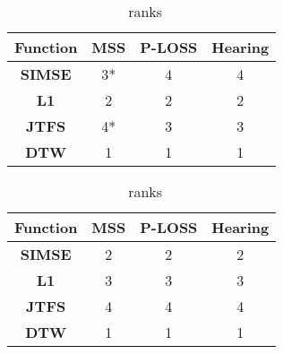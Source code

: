 \begin{table}[htbp]
\begin{minipage}{0.45\textwidth}
    \centering
    \begin{tabular}{|c|c|c|c|}
    \hline
    \textbf{Function} & \textbf{MSS} & \textbf{P-LOSS} & \textbf{Hearing} \\
    \hline
    \textbf{SIMSE} & 3* & 4\phantom{*} & 4\phantom{*} \\
    \textbf{L1}    & 2\phantom{*} & 2\phantom{*} & 2\phantom{*} \\
    \textbf{JTFS}  & 4* & 3\phantom{*} & 3\phantom{*} \\
    \textbf{DTW}   & 1\phantom{*} & 1\phantom{*} & 1\phantom{*} \\
    \hline
    \end{tabular}
    \caption{\footnotesize \AmpMod~ranks}
    \label{tab:p2}
\end{minipage}%
\hspace{1cm}
\begin{minipage}{0.45\textwidth}
    \centering
    \begin{tabular}{|c|c|c|c|}
    \hline
    \textbf{Function} & \textbf{MSS} & \textbf{P-LOSS} & \textbf{Hearing} \\
    \hline
   \textbf{SIMSE} & 2\phantom{*} & 2\phantom{*} & 2\phantom{*} \\
    \textbf{L1} & 3\phantom{*} & 3\phantom{*} & 3\phantom{*} \\
    \textbf{JTFS} & 4\phantom{*} & 4\phantom{*} & 4\phantom{*} \\
    \textbf{DTW} & 1\phantom{*} & 1\phantom{*} & 1\phantom{*} \\
    \hline
    \end{tabular}
    \caption{\footnotesize \FMMod~ranks}
    \label{tab:p3}
\end{minipage}
\end{table}


